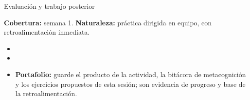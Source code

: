 \documentclass[10pt,aspectratio=169]{beamer}
\begin{document}
\begin{frame}{Evaluación y trabajo posterior}
  \small
  \begin{evalbox}
    \textbf{Cobertura:} semana 1. \textbf{Naturaleza:} práctica dirigida en equipo, con retroalimentación inmediata.
  \end{evalbox}
  \begin{itemize}
    \item \criterios
    \item \declaracionia
    \item \textbf{Portafolio:} guarde el producto de la actividad, la bitácora de metacognición y los ejercicios propuestos de esta sesión; son evidencia de progreso y base de la retroalimentación.
  \end{itemize}
\end{frame}
\end{document}
